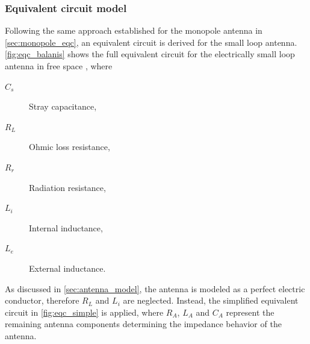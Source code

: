 \subsubsection{Equivalent circuit model}\label{sec:eqc_loop}

Following the same approach established for the monopole antenna in \cref{sec:monopole_eqc}, an 
equivalent circuit is derived for the small loop antenna. 
\autoref{fig:eqc_balanis} shows the full equivalent circuit for the 
electrically small loop antenna in free space \cite[p.~244]{Balanis_1997}, 
where

\hspace{1cm}\begin{minipage}{\dimexpr\textwidth-2cm}
	\begin{description}
		\item[$C_s$]   Stray capacitance,
		\item[$R_L$]   Ohmic loss resistance,
		\item[$R_r$]   Radiation resistance,
		\item[$L_i$]   Internal inductance,
		\item[$L_e$]   External inductance.
	\end{description}
\end{minipage}

As discussed in \cref{sec:antenna_model}, the antenna is modeled as a perfect 
electric conductor, therefore $R_L$ and $L_i$ are neglected. Instead, the 
simplified equivalent circuit in \autoref{fig:eqc_simple} is applied, where 
$R_A$, $L_A$ and $C_A$ represent the remaining antenna components determining the impedance behavior of the antenna.

